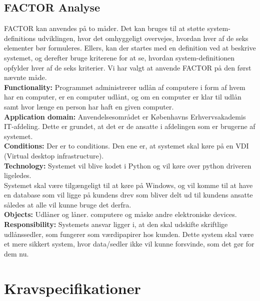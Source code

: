 \documentclass[a4paper]{article}
\begin{document}
\subsection{FACTOR Analyse}
FACTOR kan anvendes på to måder. Det kan bruges til at støtte system-definitions udviklingen, hvor det omhyggeligt overvejes, hvordan hver af de seks elementer bør formuleres. Ellers, kan der startes med en definition ved at beskrive systemet, og derefter bruge kriterene for at se, hvordan system-definitionen opfylder hver af de seks kriterier. Vi har valgt at anvende FACTOR på den først nævnte måde. \\
\textbf{Functionality:} Programmet administrerer udlån af computere i form af hvem har en computer, er en computer udlånt, og om en computer er klar til udlån samt hvor længe en person har haft en given computer.\\
\textbf{Application domain:} Anvendelsesområdet er Københavns Erhvervsakademis IT-afdeling. Dette er grundet, at det er de ansatte i afdelingen som er brugerne af systemet.\\
\textbf{Conditions:} Der er to conditions. Den ene er, at systemet skal køre på en VDI (Virtual desktop infrastructure).\\
\textbf{Technology:} Systemet vil blive kodet i Python og vil køre over python driveren ligeledes.\\
Systemet skal være tilgængeligt til at køre på  Windows, og vil komme til at have en database som vil ligge på kundens drev som bliver delt ud til kundens ansatte således at alle vil kunne bruge det derfra.\\
\textbf{Objects:} Udlåner og låner. computere og måske andre elektroniske devices.\\
\textbf{Responsibility:} Systemets ansvar ligger i, at den skal udskifte skriftlige udlånssedler, som fungerer som værdipapirer hos kunden. Dette system skal være et mere sikkert system, hvor data/sedler ikke vil kunne forsvinde, som det gør for dem nu.
\section{Kravspecifikationer}
\end{document}
